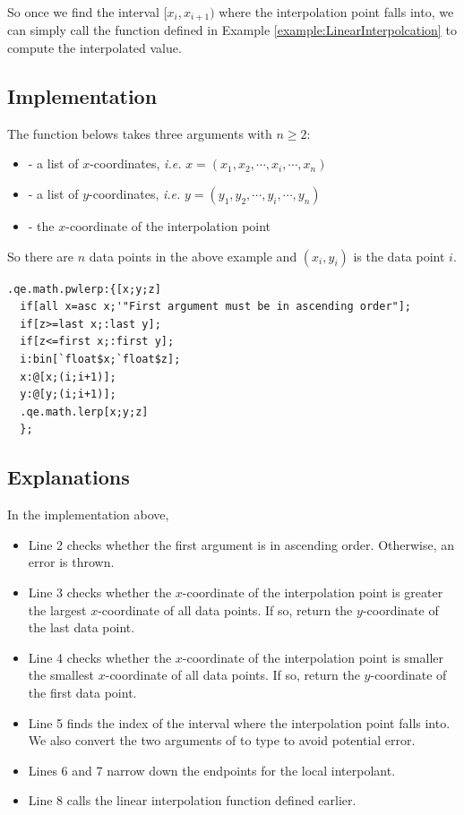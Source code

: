 So once we find the interval $[x_i, x_{i+1})$ where the interpolation point falls into, we can simply call the function defined in Example \ref{example:LinearInterpolcation} to compute the interpolated value.

\subsection{Implementation}
The function belows takes three arguments with $n \ge 2$:

\begin{itemize}
\item {} - a list of $x$-coordinates, \emph{i.e.} $x = (x_1, x_2, \cdots, x_i, \cdots, x_n)$
\item {} - a list of $y$-coordinates, \emph{i.e.} $y = (y_1, y_2, \cdots, y_i, \cdots, y_n)$
\item {} - the $x$-coordinate of the interpolation point
\end{itemize}

So there are $n$ data points in the above example and $(x_i,y_i)$ is the data point $i$.

\begin{verbatim}
.qe.math.pwlerp:{[x;y;z]
  if[all x=asc x;'"First argument must be in ascending order"];
  if[z>=last x;:last y];
  if[z<=first x;:first y];
  i:bin[`float$x;`float$z];
  x:@[x;(i;i+1)];
  y:@[y;(i;i+1)];
  .qe.math.lerp[x;y;z]
  };
\end{verbatim}


\subsection{Explanations}
In the implementation above,

\begin{itemize}
\item Line 2 checks whether the first argument is in ascending order. Otherwise, an error is thrown.
\item Line 3 checks whether the $x$-coordinate of the interpolation point is greater the largest $x$-coordinate of all data points. If so, return the $y$-coordinate of the last data point.
\item Line 4 checks whether the $x$-coordinate of the interpolation point is smaller the smallest $x$-coordinate of all data points. If so, return the $y$-coordinate of the first data point.
\item Line 5 finds the index of the interval where the interpolation point falls into. We also convert the two arguments of  to  type to avoid potential  error.
\item Lines 6 and 7 narrow down the endpoints for the local interpolant.
\item Line 8 calls the linear interpolation function defined earlier.
\end{itemize}


